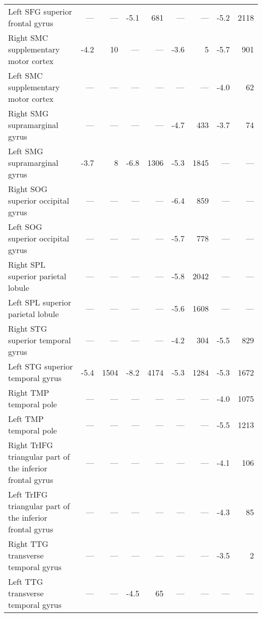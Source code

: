\documentclass[]{article}
\begin{document}
\begin{table}[ht]
{\begin{tabular}{lrrrrrrrr}
  Left SFG   superior frontal gyrus & --- & --- & -5.1 & 681 & --- & --- & -5.2 & 2118 \\ 
  Right SMC   supplementary motor cortex & -4.2 & 10 & --- & --- & -3.6 & 5 & -5.7 & 901 \\ 
  Left SMC   supplementary motor cortex & --- & --- & --- & --- & --- & --- & -4.0 & 62 \\ 
  Right SMG   supramarginal gyrus & --- & --- & --- & --- & -4.7 & 433 & -3.7 & 74 \\ 
  Left SMG   supramarginal gyrus & -3.7 & 8 & -6.8 & 1306 & -5.3 & 1845 & --- & --- \\ 
  Right SOG   superior occipital gyrus & --- & --- & --- & --- & -6.4 & 859 & --- & --- \\ 
  Left SOG   superior occipital gyrus & --- & --- & --- & --- & -5.7 & 778 & --- & --- \\ 
  Right SPL   superior parietal lobule & --- & --- & --- & --- & -5.8 & 2042 & --- & --- \\ 
  Left SPL   superior parietal lobule & --- & --- & --- & --- & -5.6 & 1608 & --- & --- \\ 
  Right STG   superior temporal gyrus & --- & --- & --- & --- & -4.2 & 304 & -5.5 & 829 \\ 
  Left STG   superior temporal gyrus & -5.4 & 1504 & -8.2 & 4174 & -5.3 & 1284 & -5.3 & 1672 \\ 
  Right TMP   temporal pole & --- & --- & --- & --- & --- & --- & -4.0 & 1075 \\ 
  Left TMP   temporal pole & --- & --- & --- & --- & --- & --- & -5.5 & 1213 \\ 
  Right TrIFG triangular part of the inferior frontal gyrus & --- & --- & --- & --- & --- & --- & -4.1 & 106 \\ 
  Left TrIFG triangular part of the inferior frontal gyrus & --- & --- & --- & --- & --- & --- & -4.3 & 85 \\ 
  Right TTG   transverse temporal gyrus & --- & --- & --- & --- & --- & --- & -3.5 & 2 \\ 
  Left TTG   transverse temporal gyrus & --- & --- & -4.5 & 65 & --- & --- & --- & --- \\ 
   \hline
\end{tabular}
}
\end{table}
\end{document}
